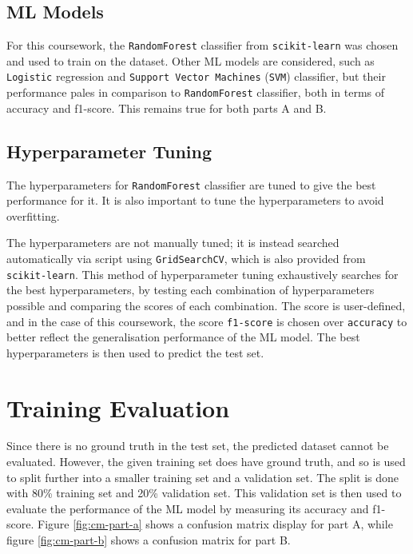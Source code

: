 \documentclass[12pt]{article}
\begin{document}
        \subsection{ML Models}

            For this coursework, the \verb|RandomForest| classifier from \verb|scikit-learn| was chosen and used to
            train on the dataset. Other ML models are considered, such as \verb|Logistic| regression and 
            \verb|Support Vector Machines| (\verb|SVM|) classifier, but their performance pales in comparison to 
            \verb|RandomForest| classifier, both in terms of accuracy and f1-score. This remains true for both parts
            A and B. 

        \subsection{Hyperparameter Tuning}

            The hyperparameters for \verb|RandomForest| classifier are tuned to give the best performance for it. It is
            also important to tune the hyperparameters to avoid overfitting. 
            
            The hyperparameters are not manually tuned; it is instead searched automatically via script using 
            \verb|GridSearchCV|, which is also provided from \verb|scikit-learn|. This method of hyperparameter tuning
            exhaustively searches for the best hyperparameters, by testing each combination of hyperparameters possible
            and comparing the scores of each combination. The score is user-defined, and in the case of this 
            coursework, the score \verb|f1-score| is chosen over \verb|accuracy| to better reflect the generalisation
            performance of the ML model. The best hyperparameters is then used to predict the test set.

    \section{Training Evaluation}

        Since there is no ground truth in the test set, the predicted dataset cannot be evaluated. However, the given
        training set does have ground truth, and so is used to split further into a smaller training set and a 
        validation set. The split is done with 80\% training set and 20\% validation set. This validation set is then
        used to evaluate the performance of the ML model by measuring its accuracy and f1-score. Figure 
        \ref{fig:cm-part-a} shows a confusion matrix display for part A, while figure \ref{fig:cm-part-b} shows a
        confusion matrix for part B.
\end{document}
